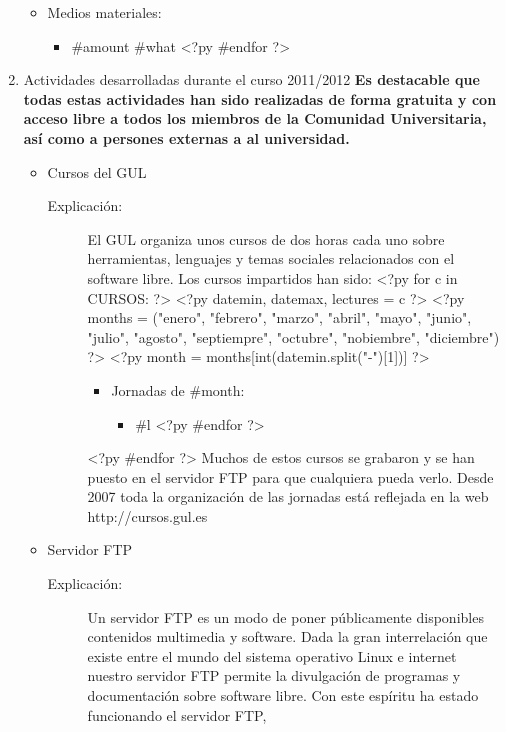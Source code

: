 \documentclass[a4paper,12pt]{report}
\begin{document}
\begin{enumerate}
\begin{itemize}
\item{Medios materiales:}
\begin{itemize}
<?py for o in INVENTARIO: ?>
<?py     amount, what = o ?>
\item{} #{amount} #{what}
<?py #endfor ?>
\end{itemize}
\end{itemize}
\newpage
\item \textsf{\Large Actividades desarrolladas durante el curso 2011/2012}
\newline
\newline
\textbf{Es destacable que todas estas actividades han sido realizadas de forma
gratuita y con acceso libre a todos los miembros de la Comunidad Universitaria, así como a persones externas a al universidad.}
\begin{itemize}
\item Cursos del GUL
\begin{description}
\item[Explicación:] El GUL organiza
unos cursos de dos horas cada uno sobre herramientas, lenguajes y temas
sociales relacionados con el software libre. Los cursos impartidos han sido:
<?py for c in CURSOS: ?>
<?py     datemin, datemax, lectures = c ?>
<?py     months = ("enero", "febrero", "marzo", "abril", "mayo", "junio", "julio", "agosto", "septiempre", "octubre", "nobiembre", "diciembre") ?>
<?py     month = months[int(datemin.split("-")[1])] ?>
\begin{itemize}
\item Jornadas de #{month}:
\begin{itemize}
<?py     for l in lectures: ?>
\item #{l}
<?py #endfor ?>
\end{itemize}
\end{itemize}
<?py #endfor ?>
Muchos de estos cursos se grabaron y se han puesto en el servidor FTP para que cualquiera pueda verlo.
Desde 2007 toda la organización de las jornadas está reflejada en la web http://cursos.gul.es
\end{description}
\item Servidor FTP
\begin{description}
\item[Explicación:] 
Un servidor FTP es un modo de poner públicamente disponibles contenidos multimedia y software.
Dada la gran interrelación que existe entre el
mundo del sistema operativo Linux e internet nuestro servidor FTP
permite la divulgación de programas y documentación sobre software
libre. Con este espíritu ha estado funcionando el servidor FTP, 

\end{description}
\end{itemize}
\end{enumerate}
\end{document}
